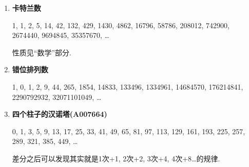 \begin{enumerate}

\item \textbf{卡特兰数}

1, 1, 2, 5, 14, 42, 132, 429, 1430, 4862, 16796, 58786, 208012, 742900, 2674440, 9694845, 35357670, \dots

性质见``数学''部分.

\item \textbf{错位排列数}

1, 0, 1, 2, 9, 44, 265, 1854, 14833, 133496, 1334961, 14684570, 176214841, 2290792932, 32071101049, \dots

\item \textbf{四个柱子的汉诺塔(A007664)}

0, 1, 3, 5, 9, 13, 17, 25, 33, 41, 49, 65, 81, 97, 113, 129, 161, 193, 225, 257, 289, 321, 385, 449, \dots

差分之后可以发现其实就是1次+1, 2次+2, 3次+4, 4次+8\dots 的规律.

\end{enumerate}